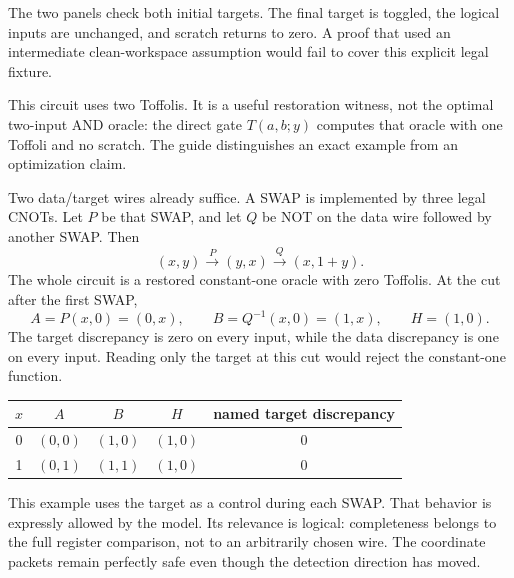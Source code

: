
The two panels check both initial targets. The final target is toggled,
the logical inputs are unchanged, and scratch returns to zero. A proof that
used an intermediate clean-workspace assumption would fail to cover this
explicit legal fixture.

This circuit uses two Toffolis. It is a useful restoration witness, not the
optimal two-input AND oracle: the direct gate $T(a,b;y)$ computes that oracle
with one Toffoli and no scratch. The guide distinguishes an exact example
from an optimization claim.


Two data/target wires already suffice. A SWAP is implemented by three legal
CNOTs. Let $P$ be that SWAP, and let $Q$ be NOT on the data wire followed
by another SWAP. Then
\[
 (x,y)\xrightarrow{P}(y,x)
 \xrightarrow{Q}(x,1+y).
\]
The whole circuit is a restored constant-one oracle with zero Toffolis.
At the cut after the first SWAP,
\[
 A=P(x,0)=(0,x),\qquad B=Q^{-1}(x,0)=(1,x),
 \qquad H=(1,0).
\]
The target discrepancy is zero on every input, while the data discrepancy
is one on every input. Reading only the target at this cut would reject
the constant-one function.

\begin{center}
\begin{tabular}{@{}ccccc@{}}\toprule
$x$ & $A$ & $B$ & $H$ & named target discrepancy\\\midrule
0 & $(0,0)$ & $(1,0)$ & $(1,0)$ & 0\\
1 & $(0,1)$ & $(1,1)$ & $(1,0)$ & 0\\\bottomrule
\end{tabular}
\end{center}

This example uses the target as a control during each SWAP. That behavior
is expressly allowed by the model. Its relevance is logical: completeness
belongs to the full register comparison, not to an arbitrarily chosen wire.
The coordinate packets remain perfectly safe even though the detection
direction has moved.


